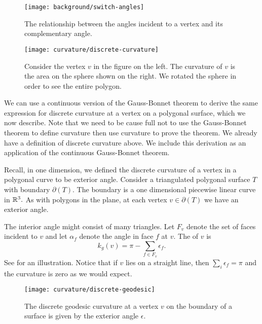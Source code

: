 \begin{figure}[htb]
\centering
\texttt{[image: background/switch-angles]}
\caption{The relationship between the angles incident to a vertex and
its complementary angle.}
\label{fig:switcheroo}
\end{figure}





\begin{figure}[htb]
\centering
\texttt{[image: curvature/discrete-curvature]}
\caption{Consider the vertex $v$ in the figure on the left. The curvature of $v$
is the area on the sphere shown on the right. We rotated the sphere
in order to see the entire polygon.}
\label{fig:discrete-curvature}
\end{figure}







We can use a continuous version of the Gauss-Bonnet theorem to derive
the same expression for discrete curvature at a vertex on a polygonal surface,
which we now describe.
Note that we need to be cause full not to use the Gauss-Bonnet theorem to
define curvature then use curvature to prove the theorem. 
We already have a definition of discrete curvature above. We include this derivation
as an application of the continuous Gauss-Bonnet theorem.

Recall, in one dimension, we defined the discrete curvature of a vertex in a
polygonal curve to be exterior angle.
Consider a triangulated polygonal surface $T$ with boundary $\partial(T)$.
The boundary is a one dimensional piecewise linear curve in $\mathbb{R}^3.$
As with polygons in the plane, at each vertex $v\in \partial(T)$ 
we have an exterior angle.

The interior angle might consist of many triangles.
Let $F_v$  denote the set of faces incident to $v$ and let
$\alpha_f$ denote the angle in face $f$ at $v$.
The 
of $v$  is
$$k_{g}(v)= \pi-\sum_{f\in F_v}\epsilon_f.$$
See  for an illustration.
Notice that if $v$ lies on a straight line, then $\sum_{i}\epsilon_f=\pi$
and the curvature is zero as we would expect.


\begin{figure}[htb]
\centering
	\texttt{[image: curvature/discrete-geodesic]}
	\caption{The discrete geodesic curvature at a vertex $v$ on the boundary
	of a surface is given by the exterior angle $\epsilon$.}
	\label{fig:discrete-geodesic}
\end{figure}


